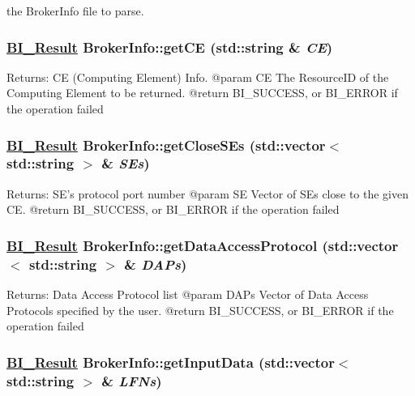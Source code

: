 the Broker\-Info file to parse. \hypertarget{classBrokerInfo_a2}{
\subsubsection[getCE]{\setlength{\rightskip}{0pt plus 5cm}\hyperlink{bi__result_8h_a2}{BI\_\-Result} Broker\-Info::get\-CE (std::string \& {\em CE})}}
\label{classBrokerInfo_a2}


\begin{Desc}
\item[Returns:]CE (Computing Element) Info. @param CE The Resource\-ID of the Computing Element to be returned. @return BI\_\-SUCCESS, or BI\_\-ERROR if the operation failed \end{Desc}
\hypertarget{classBrokerInfo_a8}{
\subsubsection[getCloseSEs]{\setlength{\rightskip}{0pt plus 5cm}\hyperlink{bi__result_8h_a2}{BI\_\-Result} Broker\-Info::get\-Close\-SEs (std::vector$<$ std::string $>$ \& {\em SEs})}}
\label{classBrokerInfo_a8}


\begin{Desc}
\item[Returns:]SE's protocol port number @param SE Vector of SEs close to the given CE. @return BI\_\-SUCCESS, or BI\_\-ERROR if the operation failed \end{Desc}
\hypertarget{classBrokerInfo_a3}{
\subsubsection[getDataAccessProtocol]{\setlength{\rightskip}{0pt plus 5cm}\hyperlink{bi__result_8h_a2}{BI\_\-Result} Broker\-Info::get\-Data\-Access\-Protocol (std::vector$<$ std::string $>$ \& {\em DAPs})}}
\label{classBrokerInfo_a3}


\begin{Desc}
\item[Returns:]Data Access Protocol list @param DAPs Vector of Data Access Protocols specified by the user. @return BI\_\-SUCCESS, or BI\_\-ERROR if the operation failed \end{Desc}
\hypertarget{classBrokerInfo_a11}{
\subsubsection[getInputData]{\setlength{\rightskip}{0pt plus 5cm}\hyperlink{bi__result_8h_a2}{BI\_\-Result} Broker\-Info::get\-Input\-Data (std::vector$<$ std::string $>$ \& {\em LFNs})}}
\label{classBrokerInfo_a11}


